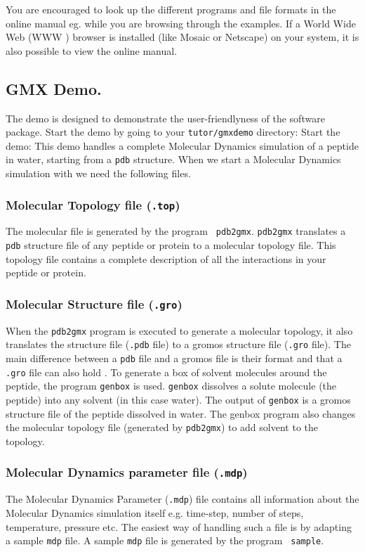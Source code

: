 You are encouraged to look up the different {\gromacs} programs and
file formats in the online manual eg.
while you are browsing through the examples. If a World Wide Web (WWW
) browser is installed (like Mosaic or Netscape) on your system, it
is also possible to view the online manual.

\subsection{GMX Demo.}
The {\gromacs} demo is designed to demonstrate the user-friendlyness
of the {\gromacs} software package. Start the {\gromacs} demo by going
to your {\tt tutor/gmxdemo} directory:
 Start the demo: 
This demo handles a complete Molecular Dynamics simulation of a
peptide in water, starting from a {\tt pdb} structure. When we start a
Molecular Dynamics simulation with {\gromacs} we need the following
files. 

\subsubsection{Molecular Topology file ({\tt .top})}
The molecular  file is generated by the program {\tt
pdb2gmx}. {\tt pdb2gmx} translates a {\tt pdb} structure file of any peptide
or protein
to a molecular topology file. This topology file contains a complete
description of all the interactions in your peptide or protein.
 
\subsubsection{Molecular Structure file ({\tt .gro})}
When the {\tt pdb2gmx} program is executed to generate a molecular
topology, it also translates the structure file ({\tt .pdb} file) to a gromos
structure file ({\tt .gro} file). The main difference between a {\tt pdb} 
file and a  gromos file is their format and that
a {\tt .gro} file can also hold .
To generate a box of solvent molecules
around the peptide, the program {\tt genbox} is used. {\tt genbox}
dissolves a solute molecule (the peptide) into any solvent (in this
case water). The output of {\tt genbox} is a gromos structure file of
the peptide dissolved in water. The genbox program also changes the
molecular topology file (generated by {\tt pdb2gmx}) to add solvent
to the topology. 

\subsubsection{Molecular Dynamics parameter file ({\tt .mdp})}
The Molecular Dynamics Parameter ({\tt .mdp}) file contains all
information about the Molecular Dynamics simulation itself 
e.g. time-step, number of steps, temperature, pressure etc. The
easiest way of handling such a file is by adapting a sample {\tt mdp}
file. A sample {\tt mdp} file is generated by the program {\tt
sample}. 


